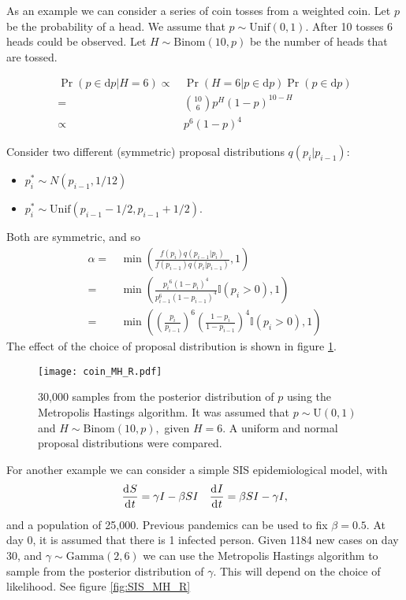 As an example we can consider a series of coin tosses from a weighted coin. Let $p$ be the probability of a head. We assume that $p\sim\mathrm{Unif}(0,1).$ After 10 tosses 6 heads could be observed. Let $H\sim\mathrm{Binom}(10, p)$ be the number of heads that are tossed.

\begin{align*}
    \Pr(p\in\mathrm{d}p| H= 6)\propto&\, \Pr(H= 6|p\in\mathrm{d}p)\Pr(p\in\mathrm{d}p)\\
    =&\, {10 \choose 6} p^H(1 - p)^{10 - H}\\
    \propto&\, p^6(1 - p)^{4}
\end{align*}

Consider two different (symmetric) proposal distributions $q(p_i|p_{i - 1})$: \begin{itemize}
    \item $p_i^* \sim N(p_{i - 1}, 1/12)$
    \item $p_i^* \sim \mathrm{Unif}(p_{i - 1} - 1/2, p_{i - 1} + 1/2)$.
\end{itemize} Both are symmetric, and so \begin{align*}
    \alpha =&\, \min\left(\frac{f(p_i)q(p_{i - 1}|p_{i})}{f(p_{i - 1})q(p_i|p_{i - 1})}, 1\right)\\
    =&\, \min\left(\frac{{p_i}^{6}(1 - p_i)^4}{p_{i - 1}^6(1 - p_{i - 1})^4}\mathbb{I}(p_i > 0), 1\right)\\
    =&\, \min\left(\left(\frac{p_i}{p_{i - 1}}\right)^{6}\left(\frac{1 - p_i}{1 - p_{i - 1}}\right)^4\mathbb{I}(p_i > 0), 1\right)
\end{align*} The effect of the choice of proposal distribution is shown in figure \ref{fig:coin_R}.

\begin{figure}[htbp]
    \centering
    \texttt{[image: coin\_MH\_R.pdf]}
    \caption{30,000 samples from the posterior distribution of $p$ using the Metropolis Hastings algorithm. It was assumed that $p\sim \mathrm{U}(0,1)$ and $H \sim \mathrm{Binom}(10, p),$ given $H = 6.$ A uniform and normal proposal distributions were compared.}
    \label{fig:coin_R}
\end{figure}

For another example we can consider a simple SIS epidemiological model, with $$\frac{\diff S}{\diff t} = \gamma I - \beta SI \quad \frac{\diff I}{\diff t} = \beta SI -  \gamma I,$$ and a population of 25,000. Previous pandemics can be used to fix $\beta = 0.5.$ At day 0, it is assumed that there is 1 infected person. Given 1184 new cases on day 30, and $\gamma\sim \mathrm{Gamma}(2, 6)$ we can use the Metropolis Hastings algorithm to sample from the posterior distribution of $\gamma.$  This will depend on the choice of likelihood. See figure \ref{fig:SIS_MH_R}

